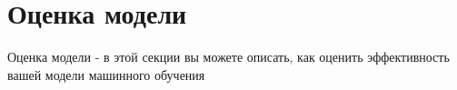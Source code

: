 


\section{Оценка модели}\label{sec:applying_model}

    Оценка модели - в этой секции вы можете описать, как оценить эффективность вашей модели машинного обучения

